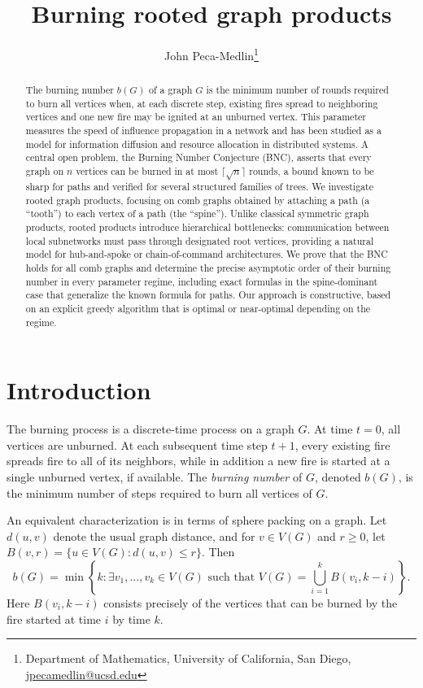 \documentclass{article}
\title{Burning rooted graph products}
\author{John Peca-Medlin\thanks{Department of Mathematics, University of California, San Diego, \href{mailto:jpecamedlin@ucsd.edu}{jpecamedlin@ucsd.edu}}}
\date{}
\begin{document}
\maketitle

\begin{abstract}
    The burning number $b(G)$ of a graph $G$ is the minimum number of rounds required to burn all vertices when, at each discrete step, existing fires spread to neighboring vertices and one new fire may be ignited at an unburned vertex. This parameter measures the speed of influence propagation in a network and has been studied as a model for information diffusion and resource allocation in distributed systems. A central open problem, the Burning Number Conjecture (BNC), asserts that every graph on $n$ vertices can be burned in at most $\lceil \sqrt n\rceil$ rounds, a bound known to be sharp for paths and verified for several structured families of trees. We investigate rooted graph products, focusing on comb graphs obtained by attaching a path (a ``tooth'') to each vertex of a  path (the ``spine''). Unlike classical symmetric graph products, rooted products introduce hierarchical bottlenecks: communication between local subnetworks must pass through designated root vertices, providing a natural model for hub-and-spoke or chain-of-command architectures. We prove that the BNC holds for all comb graphs and determine the precise asymptotic order of their burning number in every parameter regime, including exact formulas in the spine-dominant case that generalize the known formula for paths. Our approach is constructive, based on an explicit greedy algorithm that is optimal or near-optimal depending on the regime.
\end{abstract}




\section{Introduction}

The burning process is a discrete-time process on a graph $G$. 
At time $t=0$, all vertices are unburned. 
At each subsequent time step $t+1$, every existing fire spreads fire to all of its neighbors, while in addition a new fire is started at a single unburned vertex, if available. 
The \textit{burning number} of $G$, denoted $b(G)$, is the minimum number of steps required to burn all vertices of $G$.

An equivalent characterization is in terms of sphere packing on a graph.  Let $d(u,v)$ denote the usual graph distance, and for $v \in V(G)$ and $r \ge 0$, let $B(v,r) = \{ u \in V(G) : d(u,v) \le r \}$. Then
\begin{equation*}
b(G) = \min \left\{ k : \exists v_1,\ldots,v_k \in V(G) \text{ such that }
V(G) = \bigcup_{i=1}^k B(v_i,k-i) \right\}.
\end{equation*}
Here $B(v_i,k-i)$ consists precisely of the vertices that can be burned by the fire started at time $i$ by time $k$. 
\end{document}
